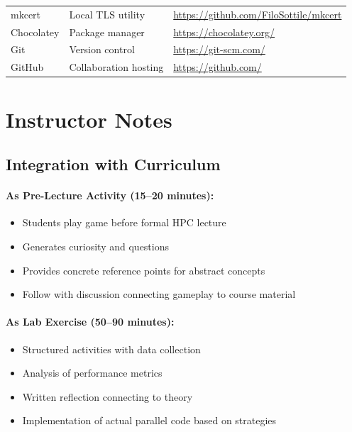 \begin{table}[htbp]
\begin{tabular}{@{}p{3.2cm}p{2.8cm}p{7.0cm}@{}}
        mkcert                & Local TLS utility          & \url{https://github.com/FiloSottile/mkcert}                      \\
        Chocolatey            & Package manager            & \url{https://chocolatey.org/}                                    \\
        Git                   & Version control            & \url{https://git-scm.com/}                                       \\
        GitHub                & Collaboration hosting      & \url{https://github.com/}                                        \\
        \bottomrule
    \end{tabular}
\end{table}
\section{Instructor Notes}
\label{app:d:instructor-notes}

\subsection{Integration with Curriculum}

\paragraph{As Pre-Lecture Activity (15--20 minutes):}
\begin{itemize}
    \item Students play game before formal HPC lecture
    \item Generates curiosity and questions
    \item Provides concrete reference points for abstract concepts
    \item Follow with discussion connecting gameplay to course material
\end{itemize}

\paragraph{As Lab Exercise (50--90 minutes):}
\begin{itemize}
    \item Structured activities with data collection
    \item Analysis of performance metrics
    \item Written reflection connecting to theory
    \item Implementation of actual parallel code based on strategies
\end{itemize}

